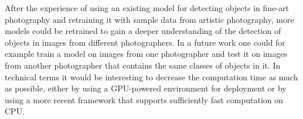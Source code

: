 \documentclass[a4paper,10pt,hidelinks]{scrartcl}
\begin{document}
After the experience of using an existing model for detecting objects in fine-art photography and retraining it with sample data from artistic photography, more models could be retrained to gain a deeper understanding of the detection of objects in images from different photographers. In a future work one could for example train a model on images from one photographer and test it on images from another photographer that contains the same classes of objects in it. In technical terms it would be interesting to decrease the computation time as much as possible, either by using a GPU-powered environment for deployment or by using a more recent framework that supports sufficiently fast computation on CPU.
\end{document}
